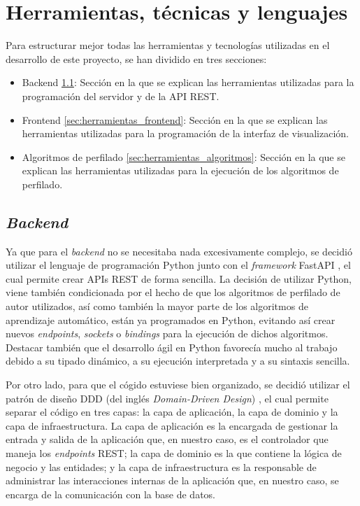 \chapter{Herramientas, técnicas y lenguajes}
\label{chap:herramientas}

Para estructurar mejor todas las herramientas y tecnologías utilizadas en el desarrollo de este proyecto, se han dividido en tres secciones:
\begin{itemize}
		\item Backend \ref{sec:herramientas_backend}: Sección en la que se explican las herramientas utilizadas para la programación del servidor y de la API REST.
		\item Frontend \ref{sec:herramientas_frontend}: Sección en la que se explican las herramientas utilizadas para la programación de la interfaz de visualización.
		\item Algoritmos de perfilado \ref{sec:herramientas_algoritmos}: Sección en la que se explican las herramientas utilizadas para la ejecución de los algoritmos de perfilado.
\end{itemize}
	
\section{\textit{Backend}}
\label{sec:herramientas_backend}

Ya que para el \textit{backend} no se necesitaba nada excesivamente complejo, se decidió utilizar el lenguaje de programación Python \cite{python} junto
con el \textit{framework} FastAPI \cite{fastapi}, el cual permite crear APIs REST de forma sencilla. La decisión de utilizar Python, viene también
condicionada por el hecho de que los algoritmos de perfilado de autor utilizados, así como también la mayor parte de los algoritmos de aprendizaje automático, 
están ya programados en Python, evitando así crear nuevos \textit{endpoints}, \textit{sockets} o \textit{bindings} para la ejecución de dichos algoritmos.
Destacar también que el desarrollo ágil en Python favorecía mucho al trabajo debido a su tipado dinámico, a su ejecución interpretada y a su sintaxis sencilla.

\bigskip
Por otro lado, para que el cógido estuviese bien organizado, se decidió utilizar el patrón de diseño DDD (del inglés \textit{Domain-Driven Design}) \cite{ddd}, el cual
permite separar el código en tres capas: la capa de aplicación, la capa de dominio y la capa de infraestructura. La capa de aplicación es la encargada de gestionar
la entrada y salida de la aplicación que, en nuestro caso, es el controlador que maneja los \textit{endpoints} REST; la capa de dominio es la que contiene la lógica
de negocio y las entidades; y la capa de infraestructura es la responsable de administrar las interacciones internas de la aplicación que, en nuestro
caso, se encarga de la comunicación con la base de datos.

